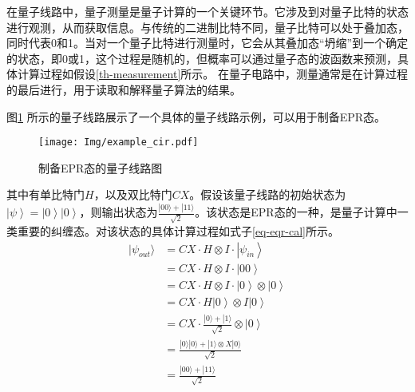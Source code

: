 在量子线路中，量子测量是量子计算的一个关键环节。它涉及到对量子比特的状态进行观测，从而获取信息。与传统的二进制比特不同，量子比特可以处于叠加态，同时代表0和1。当对一个量子比特进行测量时，它会从其叠加态“坍缩”到一个确定的状态，即0或1，这个过程是随机的，但概率可以通过量子态的波函数来预测，具体计算过程如假设\ref{th-measurement}所示。
在量子电路中，测量通常是在计算过程的最后进行，用于读取和解释量子算法的结果。
\begin{example}
    \label{ex-epr}
    图\ref{fig:example_cir} 所示的量子线路展示了一个具体的量子线路示例，可以用于制备EPR态。
    \begin{figure}[!htbp]
        \centering
        \texttt{[image: Img/example\_cir.pdf]}
        \caption{制备EPR态的量子线路图}
        \label{fig:example_cir}
    \end{figure}
    其中有单比特门\(H\)，以及双比特门\(CX\)。假设该量子线路的初始状态为\(\left|\psi\right\rangle=\left|0\right\rangle\left|0\right\rangle\)，则输出状态为$\frac{|00\rangle+|11\rangle}{\sqrt{2}}$。该状态是EPR态的一种，是量子计算中一类重要的纠缠态。对该状态的具体计算过程如式子\ref{eq-eqr-cal}所示。
\begin{equation}
    \label{eq-eqr-cal}
    \begin{aligned}
        |\psi_{out}\rangle &=  CX\cdot H\otimes I \cdot \left|\psi_{in}\right\rangle\\
        &= CX\cdot H\otimes I \cdot \left|00\right\rangle\\
        &= CX\cdot H\otimes I \cdot \left|0\right\rangle\otimes \left|0\right\rangle\\
        &= CX\cdot H\left|0\right\rangle\otimes I\left|0\right\rangle\\
        &= CX\cdot \frac{|0\rangle+|1\rangle}{\sqrt{2}} \otimes\left|0\right\rangle\\
        &= \frac{|0\rangle|0\rangle+|1\rangle\otimes X|0\rangle}{\sqrt{2}}\\
        &=\frac{|00\rangle+|11\rangle}{\sqrt{2}}
    \end{aligned}
\end{equation}

\end{example}

